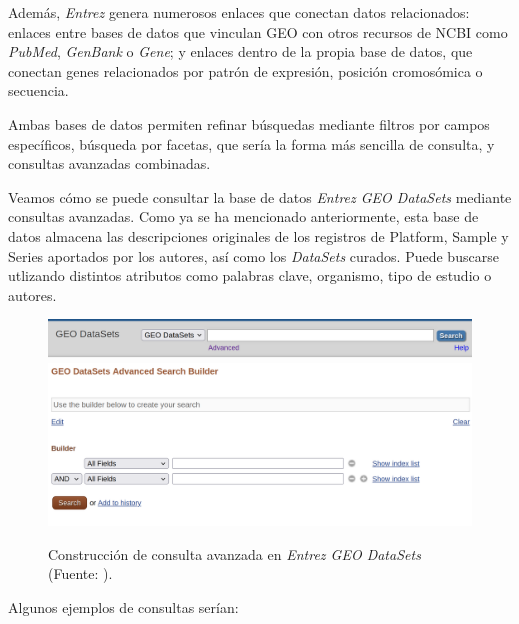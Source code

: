 Además, \textit{Entrez} genera numerosos enlaces que conectan datos relacionados: enlaces entre bases de datos que vinculan GEO con otros recursos de NCBI como \textit{PubMed}, \textit{GenBank} o \textit{Gene}; y enlaces
dentro de la propia base de datos, que conectan genes relacionados por patrón de expresión, posición cromosómica o secuencia. \newline

Ambas bases de datos permiten refinar búsquedas mediante filtros por campos específicos, búsqueda por facetas, que sería la forma más sencilla de consulta, y consultas avanzadas combinadas. \newline

Veamos cómo se puede consultar la base de datos \textit{Entrez GEO DataSets} mediante consultas avanzadas. Como ya se ha mencionado anteriormente, esta base de datos almacena las descripciones originales de los registros de Platform, Sample y Series
aportados por los autores, así como los \textit{DataSets} curados. Puede buscarse utlizando distintos atributos como palabras clave, organismo, tipo de estudio o autores. 

\begin{figure}[h]
    \centering
    \includegraphics[width=1\textwidth]{../img/geo-datasets-browser.png}
    \includegraphics[width=1\textwidth]{../img/geo-adv-queryDataset.png}
    \caption{Construcción de consulta avanzada en \textit{Entrez GEO DataSets} (Fuente: ).}  %
\end{figure}

Algunos ejemplos de consultas serían:

